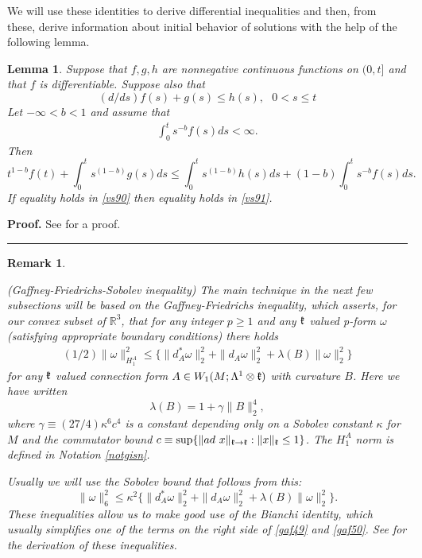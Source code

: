 \documentclass[12pt]{article}
\newtheorem{lemma}[theorem]{Lemma}
\newtheorem{remark}[theorem]{Remark}
\newenvironment{proof}[1][Proof]{\textbf{#1.} }{\ \rule{0.5em}{0.5em}}
\def \L{\Lambda}
\def \R{\mathbb R}
\def \w{\omega}
\def \kf{\frak k}
\def \beq{\begin{equation}}
\def \eeq{\end{equation}}
\def \eref{\eqref}
\numberwithin{equation}{section}
\begin{document}
\bigskip
We will use these identities to derive differential inequalities and then, from these, derive 
 information about initial behavior  of solutions with the help of the following lemma.
 
 \begin{lemma}\label{lem50}
  Suppose that $f, g, h$ are nonnegative continuous  
  functions on $(0, t]$ and that $f$ is differentiable. Suppose also  that 
 \beq
 (d/ds) f(s) + g(s) \le h(s)     ,\ \ \ 0<s \le t                                          \label{vs90}
 \eeq
 Let $-\infty < b <1$ and assume that 
 \begin{align}
 \int_0^t s^{-b} f(s) ds < \infty.                                                          \label{vs90f}
 \end{align}
 Then 
 \beq
 t^{1-b} f(t) +\int_0^t s^{(1-b)}  g(s)ds \le \int_0^t s^{(1-b)}  h(s) ds 
                   +(1-b) \int_0^t s^{-b} f(s)ds     .                                           \label{vs91}
 \eeq
  If equality holds in \eref{vs90} then equality holds in \eref{vs91}.
 \end{lemma}
  \begin{proof} See  \cite[Lemma 4.8]{G70} for  a proof.
  \end{proof}


\begin{remark}\label{GFS}{\rm  (Gaffney-Friedrichs-Sobolev inequality) 
The main technique  in the next few subsections will be based on the  
Gaffney-Friedrichs  
inequality, which                     
  asserts, for our  convex subset of $\R^3$,  that for any integer $p \ge 1$ and  any  $\kf$ valued p-form $\w$ (satisfying appropriate boundary conditions)
there holds
\begin{align}
(1/2) \|\w\|_{H_1^A}^2  \le \Big\{ \|d_A^* \w\|_2^2 + \| d_A \w\|_2^2 
                                   + \lambda(B) \|\w\|_2^2\Big\}            \label{gaf49}
  \end{align}
  for any $\kf$ valued connection form $A \in W_1(M;\L^1\otimes \kf)$ with curvature $B$.
Here    
we have written  
\beq
\lambda(B) =1 + \gamma \|B\|_2^4,           \label{gaf70} 
\eeq
where $\gamma \equiv  (27/4)\kappa^6 c^4$ is a constant depending only on a 
 Sobolev constant  $\kappa$ for $M$ and the commutator bound 
  $c\equiv \sup\{\|ad\ x\|_{\kf\rightarrow \kf}: \|x\|_{\kf} \le 1\}$.
  The $H_1^A$ norm is defined in Notation \ref{notgisn}.
 
 Usually we will use the Sobolev bound that follows from this:
\beq
\|\w\|_6^2  \le \kappa^2\Big\{ \|d_A^* \w\|_2^2 + \| d_A \w\|_2^2 
                                   + \lambda(B) \|\w\|_2^2\Big\}.            \label{gaf50}
\eeq
These inequalities allow us to make good use of the Bianchi identity, which usually  
simplifies one of the terms on the right side of \eref{gaf49} and \eref{gaf50}. 
See \cite[Theorem 2.17, Remark 2.18 and  Equ.(4.31)]{CG1} for the derivation of
 these  inequalities.    
 }
 \end{remark}
 
\end{document}
